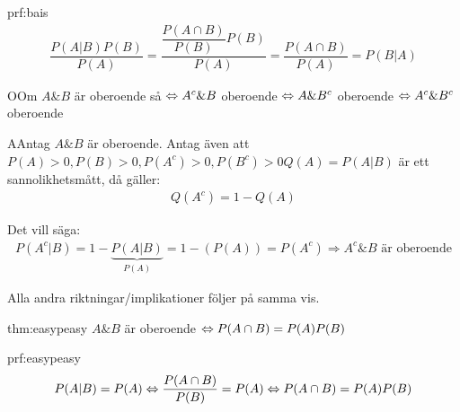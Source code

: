 \par\bigskip
\begin{prf}{prf:bais}
  \begin{equation*}
    \begin{gathered}
      \dfrac{P(A|B)P(B)}{P(A)} = \dfrac{\dfrac{P(A\cap B)}{P(B)}P(B)}{P(A)} = \dfrac{P(A\cap B)}{P(A)} = P(B|A)
    \end{gathered}
  \end{equation*}
\end{prf}
\par\bigskip
\begin{theo}
  OOm $A\&B$ är oberoende så $\Leftrightarrow A^c\&B$ oberoende $\Leftrightarrow A\&B^c$ oberoende $\Leftrightarrow A^c\&B^c$ oberoende
\end{theo}
\par\bigskip
\begin{prf}
  AAntag $A\&B$ är oberoende. Antag även att $P(A)>0, P(B)>0, P(A^c)>0, P(B^c)>0$$Q(A) = P(A|B)$ är ett sannolikhetsmått, då gäller:
  \begin{equation*}
    \begin{gathered}
      Q(A^c) = 1-Q(A)
    \end{gathered}
  \end{equation*}\par
  \noindent Det vill säga:
  \begin{equation*}
    \begin{gathered}
      P(A^c|B) = 1-\underbrace{P(A|B)}_{\text{$P(A)$}} = 1-(P(A)) = P(A^c)\Rightarrow A^c\&B\text{ är oberoende}
    \end{gathered}
  \end{equation*}\par
  \noindent Alla andra riktningar/implikationer följer på samma vis.
\end{prf}
\par\bigskip
\begin{theo}{thm:easypeasy}
  $A\&B$ är oberoende $\Leftrightarrow P(A\cap B) = P(A)P(B)$
\end{theo}
\par\bigskip
\begin{prf}{prf:easypeasy}
  \begin{equation*}
    \begin{gathered}
      P(A|B) = P(A)\Leftrightarrow \dfrac{P(A\cap B)}{P(B)} = P(A)\Leftrightarrow P(A\cap B) = P(A)P(B)
    \end{gathered}
  \end{equation*}
\end{prf}

